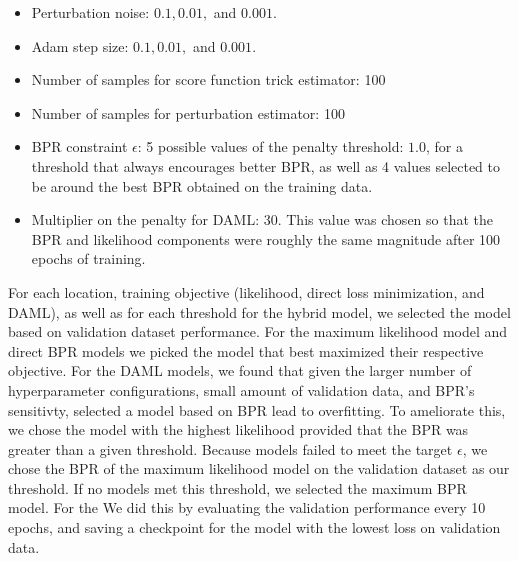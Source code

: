 \begin{itemize}
	\item Perturbation noise: $0.1, 0.01,$ and $0.001$.
    \item Adam step size: $0.1, 0.01,$ and $0.001$.
	\item Number of samples for score function trick estimator: 100
	\item Number of samples for perturbation estimator: 100
	\item BPR constraint $\epsilon$: 5 possible values of the penalty threshold: $1.0$, for a threshold that always encourages better BPR, as well as 4 values selected to be around the best BPR obtained on the training data.
	\item Multiplier on the penalty for DAML: 30. This value was chosen so that the BPR and likelihood components were roughly the same magnitude after 100 epochs of training.
\end{itemize}

For each location, training objective (likelihood, direct loss minimization, and DAML), as well as for each threshold for the hybrid model, we selected the model based on validation dataset performance. For the maximum likelihood model and direct BPR models we picked the model that best maximized their respective objective. For the DAML models, we found that given the larger number of hyperparameter configurations, small amount of validation data, and BPR's sensitivty, selected a model based on BPR lead to overfitting. To ameliorate this, we chose the model with the highest likelihood provided that the BPR was greater than a given threshold. Because models failed to meet the target $\epsilon$, we chose the BPR of the maximum likelihood model on the validation dataset as our threshold. If no models met this threshold, we selected the maximum BPR model. For the  We did this by evaluating the validation performance every 10 epochs, and saving a checkpoint for the model with the lowest loss on validation data. 



